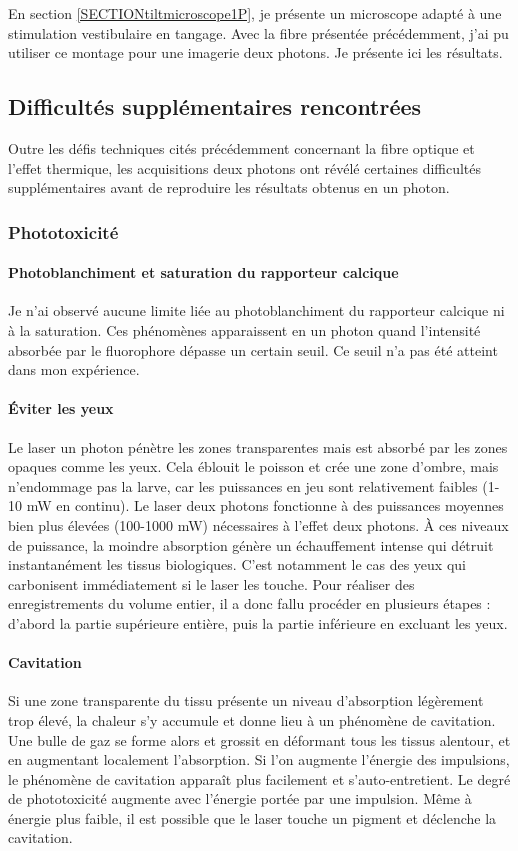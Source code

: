 En section \ref{SECTIONtiltmicroscope1P}, je présente un microscope adapté à une stimulation vestibulaire en tangage. Avec la fibre présentée précédemment, j'ai pu utiliser ce montage pour une imagerie deux photons. Je présente ici les résultats.

\subsection{Difficultés supplémentaires rencontrées}

Outre les défis techniques cités précédemment concernant la fibre optique et l'effet thermique, les acquisitions deux photons ont révélé certaines difficultés supplémentaires avant de reproduire les résultats obtenus en un photon.

\subsubsection{Phototoxicité}

\paragraph{Photoblanchiment et saturation du rapporteur calcique}
Je n'ai observé aucune limite liée au photoblanchiment du rapporteur calcique ni à la saturation. Ces phénomènes apparaissent en un photon quand l'intensité absorbée par le fluorophore dépasse un certain seuil. Ce seuil n'a pas été atteint dans mon expérience.

\paragraph{Éviter les yeux}
Le laser un photon pénètre les zones transparentes mais est absorbé par les zones opaques comme les yeux. Cela éblouit le poisson et crée une zone d'ombre, mais n'endommage pas la larve, car les puissances en jeu sont relativement faibles (1-10 mW en continu). Le laser deux photons fonctionne à des puissances moyennes bien plus élevées (100-1000 mW) nécessaires à l'effet deux photons. À ces niveaux de puissance, la moindre absorption génère un échauffement intense qui détruit instantanément les tissus biologiques. C'est notamment le cas des yeux qui carbonisent immédiatement si le laser les touche. Pour réaliser des enregistrements du volume entier, il a donc fallu procéder en plusieurs étapes : d'abord la partie supérieure entière, puis la partie inférieure en excluant les yeux. 

\paragraph{Cavitation}
Si une zone transparente du tissu présente un niveau d'absorption légèrement trop élevé, la chaleur s'y accumule et donne lieu à un phénomène de cavitation. Une bulle de gaz se forme alors et grossit en déformant tous les tissus alentour, et en augmentant localement l'absorption. Si l'on augmente l'énergie des impulsions, le phénomène de cavitation apparaît plus facilement et s'auto-entretient. Le degré de phototoxicité augmente avec l'énergie portée par une impulsion. Même à énergie plus faible, il est possible que le laser touche un pigment et déclenche la cavitation.

